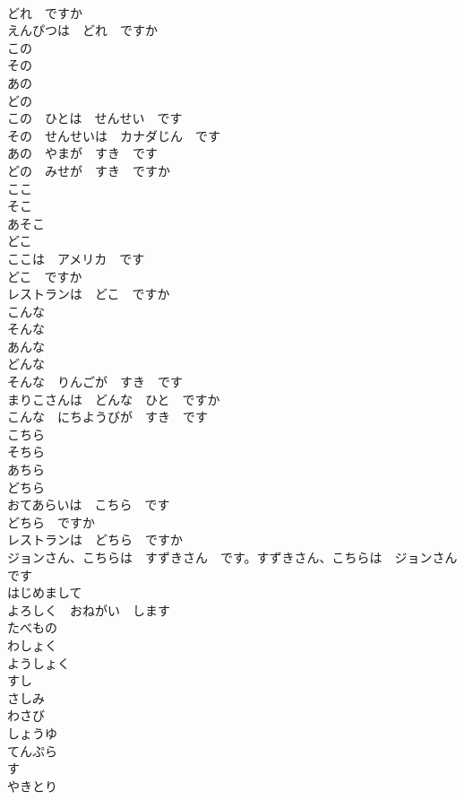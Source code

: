 \documentclass[8pt]{extreport}
\begin{document}
\begin{CJK}{UTF8}{min}
\\	どれ　ですか	
\\	えんぴつは　どれ　ですか	
\\	この	
\\	その	
\\	あの	
\\	どの	
\\	この　ひとは　せんせい　です	
\\	その　せんせいは　カナダじん　です	
\\	あの　やまが　すき　です	
\\	どの　みせが　すき　ですか	
\\	ここ	
\\	そこ	
\\	あそこ	
\\	どこ	
\\	ここは　アメリカ　です	
\\	どこ　ですか	
\\	レストランは　どこ　ですか	
\\	こんな	
\\	そんな	
\\	あんな	
\\	どんな	
\\	そんな　りんごが　すき　です	
\\	まりこさんは　どんな　ひと　ですか	
\\	こんな　にちようびが　すき　です	
\\	こちら	
\\	そちら	
\\	あちら	
\\	どちら	
\\	おてあらいは　こちら　です	
\\	どちら　ですか	
\\	レストランは　どちら　ですか	
\\	ジョンさん、こちらは　すずきさん　です。すずきさん、こちらは　ジョンさん　です	
\\	はじめまして	
\\	よろしく　おねがい　します	
\\	たべもの	
\\	わしょく	
\\	ようしょく	
\\	すし	
\\	さしみ	
\\	わさび	
\\	しょうゆ	
\\	てんぷら	
\\	す	
\\	やきとり	

\end{CJK}
\end{document}

